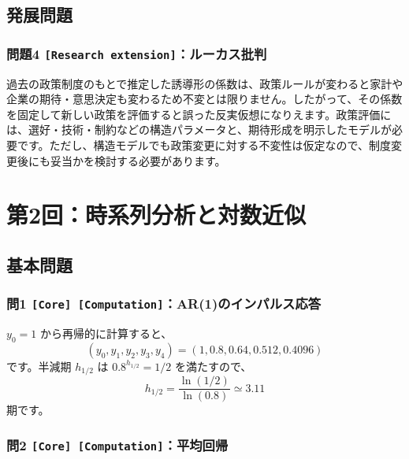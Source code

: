 \documentclass[
  japanese,
  lualatex,
  ja=standard,
  11pt,
  a4paper]{ltjsarticle}
\begin{document}

\subsection{発展問題}\label{ux767aux5c55ux554fux984c}

\subsubsection{\texorpdfstring{問題4
\texttt{{[}Research\ extension{]}}：ルーカス批判}{問題4 {[}Research extension{]}：ルーカス批判}}\label{ux554fux984c4-research-extensionux30ebux30fcux30abux30b9ux6279ux5224}

過去の政策制度のもとで推定した誘導形の係数は、政策ルールが変わると家計や企業の期待・意思決定も変わるため不変とは限りません。したがって、その係数を固定して新しい政策を評価すると誤った反実仮想になりえます。政策評価には、選好・技術・制約などの構造パラメータと、期待形成を明示したモデルが必要です。ただし、構造モデルでも政策変更に対する不変性は仮定なので、制度変更後にも妥当かを検討する必要があります。

\clearpage

\section{第2回：時系列分析と対数近似}\label{ux7b2c2ux56deux6642ux7cfbux5217ux5206ux6790ux3068ux5bfeux6570ux8fd1ux4f3c}

\subsection{基本問題}\label{ux57faux672cux554fux984c-1}

\subsubsection{\texorpdfstring{問1
\texttt{{[}Core{]}\ {[}Computation{]}}：AR(1)のインパルス応答}{問1 {[}Core{]} {[}Computation{]}：AR(1)のインパルス応答}}\label{ux554f1-core-computationar1ux306eux30a4ux30f3ux30d1ux30ebux30b9ux5fdcux7b54}

\(y_0=1\) から再帰的に計算すると、 \[
(y_0,y_1,y_2,y_3,y_4)
=(1,0.8,0.64,0.512,0.4096)
\] です。半減期 \(h_{1/2}\) は \(0.8^{h_{1/2}}=1/2\) を満たすので、 \[
h_{1/2}=\frac{\ln(1/2)}{\ln(0.8)}\simeq3.11
\] 期です。

\subsubsection{\texorpdfstring{問2
\texttt{{[}Core{]}\ {[}Computation{]}}：平均回帰}{問2 {[}Core{]} {[}Computation{]}：平均回帰}}\label{ux554f2-core-computationux5e73ux5747ux56deux5e30}
\end{document}
